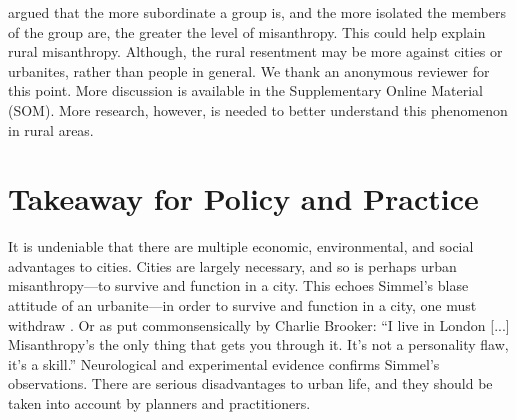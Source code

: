 \documentclass[11pt, letterpaper]{article}
\begin{document}
\begin{spacing}{1.4}
{
\citet{smith97} argued that the more subordinate a group is, and the more
isolated the members of the group are, the greater the level of misanthropy. %
 This could help explain rural misanthropy.  Although, the rural resentment may be more against cities or urbanites, rather than people in general.%
 {We thank an anonymous reviewer for this point. More discussion is available in the Supplementary Online Material (SOM).} More research, however, is needed to better understand this phenomenon in rural areas. %
}

\section*{Takeaway for Policy and Practice}

It is undeniable that there are multiple economic, environmental, and social
advantages to cities. 
 Cities are largely necessary, and so is perhaps urban misanthropy---to survive and function in a city. This echoes Simmel's blase attitude of an urbanite---in order to survive and function in a city, one must withdraw \citep{simmel03}. Or as put commonsensically by Charlie Brooker:
 ``I live in London [...] Misanthropy's the only thing that gets you
  through it. It's not a personality flaw, it's a skill.''
 Neurological \citep{lederbogen11} and experimental \citep{milgram70} evidence  confirms Simmel's observations. 
 There are serious disadvantages to urban life, and they should be taken into account by planners and practitioners. 
 

\end{spacing}
\end{document}
